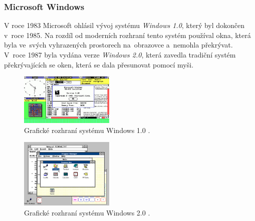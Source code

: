 \documentclass[11pt,twoside,a4paper]{book}
\begin{document}
\subsubsection{Microsoft Windows}
V roce 1983 Microsoft ohlásil vývoj systému \textit{Windows 1.0}, který byl dokončen v~roce 1985. Na rozdíl od moderních rozhraní tento systém používal okna, která byla ve~svých vyhrazených prostorech na~obrazovce a~nemohla překrývat. V~roce 1987 byla vydána verze \textit{Windows 2.0}, která zavedla tradiční systém překrývajících se oken, která se dala přesunovat pomocí myši.
\begin{figure}[!ht]
\begin{center}
  \includegraphics[width=0.4\textwidth]{figures/win1}
\caption{{\label{fig:win1GUI}}Grafické rozhraní systému Windows 1.0 \cite{bib:winImage}.}
\end{center}
\end{figure}
\begin{figure}[!ht]
\begin{center}
  \includegraphics[width=0.4\textwidth]{figures/win2}
\caption{{\label{fig:win2GUI}}Grafické rozhraní systému Windows 2.0 \cite{bib:winImage}.}
\end{center}
\end{figure}
\end{document}
